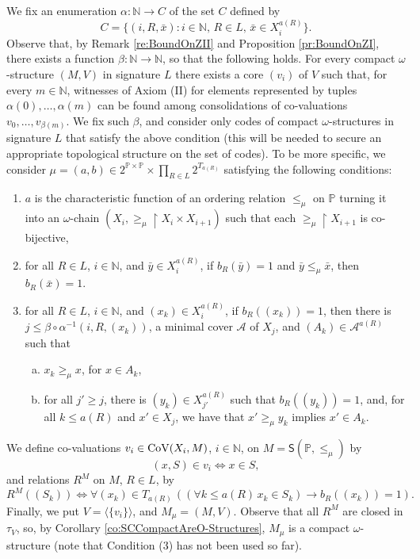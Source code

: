 \documentclass[12pt]{amsart}
\theoremstyle{plain}
\newcommand \Val{{\rm{CoV}}}
\newcommand \Sp{{\mathsf{S}}}
\newcommand \uhr{\upharpoonright}
\newcommand \NN{\mathbb{N}}
\newcommand \PPb{\mathbb{P}}
\begin{document}
	We fix an enumeration $\alpha: \NN \to C$ of the set $C$ defined by
	$$C=\{ (i,R,\bar{x}): i \in \NN, \, R \in L, \, \bar{x} \in X_i^{a(R)} \}.$$
	Observe that, by Remark \ref{re:BoundOnZII} and Proposition \ref{pr:BoundOnZI}, there exists a function $\beta: \NN  \to \NN$, so that the following holds. For every compact $\omega$-structure $(M,V)$ in signature $L$ there exists a core $(v_i)$ of $V$ such that, for every $m \in \NN$, witnesses of Axiom (II) for elements represented by tuples $\alpha(0), \ldots,  \alpha(m)$ can be found among consolidations of co-valuations $v_0, \ldots, v_{\beta(m)}$. We fix such $\beta$, and consider only codes of compact $\omega$-structures in signature $L$ that satisfy the above condition (this will be needed to secure an appropriate topological structure on the set of codes). To be more specific, we consider $\mu=(a,b) \in 2^{\PPb \times \PPb} \times \prod_{R \in L}2^{T_{a(R)}}$ satisfying the following conditions:
	\begin{enumerate}
		\item $a$ is the characteristic function of an ordering relation $\leq_\mu$ on $\PPb$ turning it into an $\omega$-chain $(X_i, \geq_\mu \uhr X_{i} \times X_{i+1})$ such that each $\geq_\mu \uhr X_{i+1}$ is co-bijective,
		\item for all $R \in L$, $i \in \NN$, and $\bar{y} \in X^{a(R)}_i$, if $b_R(\bar{y})=1$ and $\bar{y} \leq_\mu \bar{x}$, then $b_R(\bar{x})=1$.
			\item for all $R \in L$, $i \in \NN$, and $(x_k) \in X^{a(R)}_i$, if $b_R((x_k))=1$, then there is $j \leq 
			\beta \circ \alpha^{-1}(i,R,(x_k))$, a minimal cover $\mathcal{A}$ of $X_j$, and $(A_k) \in \mathcal{A}^{a(R)}$ such that
			\begin{enumerate}[a)]
				\item $x_k \geq_\mu x$,  for $x \in A_k$,
				\item for all $j' \geq j$, there is $(y_k) \in X^{a(R)}_{j'}$ such that $b_R((y_k))=1$, and, for all $k \leq a(R)$ and $x' \in X_{j}$, we have that  $x' \geq_\mu y_k$ implies $x'  \in  A_k$.
			\end{enumerate}
	\end{enumerate}
%
We define co-valuations $v_i \in \Val(X_i,M)$, $i \in \NN$, on $M=\Sp(\PPb,\leq_\mu)$ by
%
\[ (x,S) \in v_i \iff x \in S, \]
%
and relations $R^M$ on $M$, $R \in L$, by
%
\[ R^M((S_k)) \iff \forall (x_k) \in T_{a(R)} \, ( (\forall k \leq a(R) \, x_k  \in S_k) \rightarrow b_R((x_k))=1).  \]
%
Finally, we put $V=\langle \{v_i\} \rangle$, and $M_\mu=(M,V)$. Observe that all $R^M$ are closed in $\tau_V$, so, by Corollary \ref{co:SCCompactAreO-Structures}, $M_\mu$ is a compact $\omega$-structure (note that Condition (3) has not been used so far).
	
\end{document}
